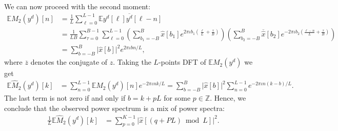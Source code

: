 \documentclass[english,12pt]{article}
\newcommand{\I}{\iota}
\newcommand{\tB}{B}
\newcommand{\hx}{\hat{x}}
\newcommand{\E}{\mathbb{E}}
\numberwithin{equation}{section}
\numberwithin{thm}{section} %
\begin{document}
We can now proceed with the second moment:
\begin{equation} \label{eq:ps}
\begin{split}
\E M_2(y^d)[n] &= \frac{1}{L}\sum_{\ell=0}^{L-1} \E y^d[\ell]\overline{y^d}[\ell-n] \\ &=  \frac{1}{LB}\sum_{\tau=0}^{B-1}\sum_{\ell=0}^{L-1}
\left(\sum_{b_1=-\tB}^{\tB}\hat{x}[b_1]e^{2\pi\I b_1 \left(\frac{\ell}{L} + \frac{\tau}{B}\right)} \right)
\left(\sum_{b_2=-\tB}^{\tB}\overline{\hx}[b_2]e^{-2\pi\I b_2 \left(\frac{\ell-n}{L} + \frac{\tau}{B}\right)} \right) \\
&=
\sum_{b=-\tB}^{\tB}\vert \hat{x}[b]\vert ^2e^{2\pi\I bn/L},
\end{split}
\end{equation}
where $\overline{z}$ denotes the conjugate of $z$.
Taking the $L$-points DFT of $\E M_2(y^d)$ we get 
\begin{equation}
\begin{split}
\E \hat{M}_2(y^d)[k] &= \sum_{n=0}^{L-1}\E M_2(y^d)[n]e^{-2\pi\I nk/L} = \sum_{b=-\tB}^{\tB}\vert \hat{x}[b]\vert^2\sum_{n=0}^{L-1}e^{-2\pi\I n(k-b)/L}.
\end{split}
\end{equation}
The last term is not zero if and only if $b = k + pL$ for some $p\in\mathbb{Z}$.  Hence, we conclude that the observed power spectrum is a mix of power spectra:
\begin{equation}
\begin{split}
\frac{1}{L}\E \hat{M}_2(y^d)[k] &=  \sum_{p=0}^{K-1} \vert \hat{x}[(q+PL)\bmod L]\vert^2.
\end{split}
\end{equation}
\end{document}
